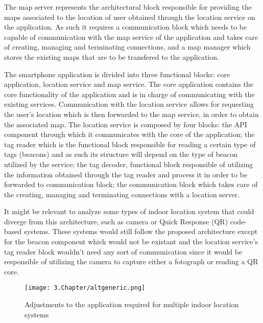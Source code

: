 The map server represents the architectural block responsible for providing the maps associated to the location of user obtained through the location service on the application. As such it requires a communication block which needs to be capable of communication with the map service of the application and takes care of creating, managing and terminating connections, and a map manager which stores the existing maps that are to be transfered to the application.

The smartphone application is divided into three functional blocks: core application, location service and map service. The core application contains the core functionality of the application and is in charge of communicating with the existing services. Communication with the location service allows for requesting the user's location which is then forwarded to the map service, in order to obtain the associated map. The location service is composed by four blocks: the API component through which it communicates with the core of the application; the tag reader which is the functional block responsible for reading a certain type of tags (beacons) and as such its structure will depend on the type of beacon utilized by the service; the tag decoder, functional block responsible of utilizing the information obtained through the tag reader and process it in order to be forwarded to communication block; the communication block which takes care of the creating, managing and terminating connections with a location server.

It might be relevant to analyze some types of indoor location system that could diverge from this architecture, such as camera or Quick Response (QR) code-based systems. These systems would still follow the proposed architecture except for the beacon component which would not be existant and the location service's tag reader block wouldn't need any sort of communication since it would be responsible of utilizing the camera to capture either a fotograph or reading a QR core.


\begin{figure}
	\centering
		\texttt{[image: 3.Chapter/altgeneric.png]}
	\caption[Adjustments to the application required for multiple indoor location systems]{Adjustments to the application required for multiple indoor location systems}
	\label{fig:altgeneric}
\end{figure}

